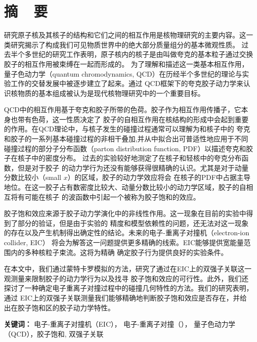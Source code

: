 
\chapter*{\LARGE  \bfseries {摘\ \ 要} }


\qquad 研究原子核及其核子的结构和它们之间的相互作用是核物理研究的主要内容。这一类研究揭示了构成我们可见物质世界中的绝大部分质量组分的基本微观性质。
过去半个多世纪的研究工作表明，原子核内的核子是由叫做夸克的基本粒子通过交换胶子的相互作用被束缚在一起而形成的。
为了理解和描述这一类基本相互作用，量子色动力学（quantum chromodynamics,
QCD）在历经半个多世纪的理论与实验工作的交替发展中被逐步建立了起来。通过
QCD框架下的夸克胶子动力学来认识核物质的基本组成被认为是现代核物理研究中的一个重要目标。

QCD中的相互作用基于夸克和胶子所带的色荷。胶子作为相互作用传播子，它本身也带有色荷，这一性质决定了
胶子的自相互作用在核结构的形成中会起到重要的作用。在QCD理论中，与核子发生的碰撞过程通常可以理解为和核子中的
夸克和胶子的一系列基本碰撞过程的非相干叠加,并从中拟合出可普适性地应用于不同碰撞过程的部分子分布函数（parton distribution function,
PDF）以描述夸克和胶子在核子中的密度分布。 过去的实验较好地测定了在核子和轻核中的夸克分布函数，但是对于胶子
的动力学行为还没有能够获得很精确的认识。尤其是对于动量分数比较小（small $x$）的区域，胶子的动力学效应将会
在核子的PDF中占据主导地位。在这一胶子占有数密度比较大、动量分数比较小的动力学区域，胶子的自相互将有可能在核子 的波函数中引起一个被称为胶子饱和的效应。

胶子饱和效应来源于胶子动力学演化中的非线性作用。这一现象在目前的实验中得到了部分的验证，但是由于实验的
精度和模型依赖性的问题，还无法对这一现象的存在以及产生机制得出确定性的结论。未来的电子-重离子对撞机（electron-ion collider, EIC）
将会为解答这一问题提供更多精确的线索。EIC能够提供宽能量范围内的多种核粒子束流。这将为精确 确定胶子行为提供良好的实验条件。

在本文中，我们通过蒙特卡罗模拟的方法，研究了通过在EIC上的双强子关联这一观测量来限制胶子的动力学行为以及找寻
胶子饱和效应的可行性。此外，我们还探讨了一种确定电子重离子对撞过程中的碰撞几何特性的方法。我们的研究表明，通过
EIC上的双强子关联测量我们能够精确地判断胶子饱和效应是否存在，并给出在胶子饱和区的胶子动力学特性。

\vspace{4mm}

\noindent
\textbf{关键词：} 电子-重离子对撞机（EIC）， 电子-重离子对撞（\eA ）， 量子色动力学 （QCD），胶子饱和, 双强子关联

